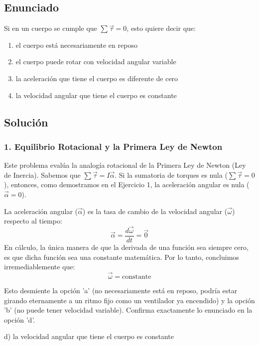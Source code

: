 \documentclass[12pt, a4paper]{article}
\begin{document}
\newpage

\subsection*{Enunciado}
Si en un cuerpo se cumple que $\sum \vec{\tau} = 0$, esto quiere decir que:
\begin{enumerate}[label=\alph*)]
    \item el cuerpo está necesariamente en reposo
    \item el cuerpo puede rotar con velocidad angular variable
    \item la aceleración que tiene el cuerpo es diferente de cero
    \item la velocidad angular que tiene el cuerpo es constante
\end{enumerate}

\subsection*{Solución}

\subsubsection*{1. Equilibrio Rotacional y la Primera Ley de Newton}
Este problema evalúa la analogía rotacional de la Primera Ley de Newton (Ley de Inercia).
Sabemos que $\sum \vec{\tau} = I \vec{\alpha}$. Si la sumatoria de torques es nula ($\sum \vec{\tau} = 0$), entonces, como demostramos en el Ejercicio 1, la aceleración angular es nula ($\vec{\alpha} = 0$).

La aceleración angular ($\vec{\alpha}$) es la tasa de cambio de la velocidad angular ($\vec{\omega}$) respecto al tiempo:
$$ \vec{\alpha} = \frac{d\vec{\omega}}{dt} = \vec{0} $$
En cálculo, la única manera de que la derivada de una función sea siempre cero, es que dicha función sea una constante matemática.
Por lo tanto, concluimos irremediablemente que:
$$ \vec{\omega} = \text{constante} $$

Esto desmiente la opción 'a' (no necesariamente está en reposo, podría estar girando eternamente a un ritmo fijo como un ventilador ya encendido) y la opción 'b' (no puede tener velocidad variable). Confirma exactamente lo enunciado en la opción 'd'.

\begin{tcolorbox}[colback=green!5!white, colframe=green!50!black, title=Respuesta Final]
\centering \Large d) la velocidad angular que tiene el cuerpo es constante
\end{tcolorbox}
\end{document}
